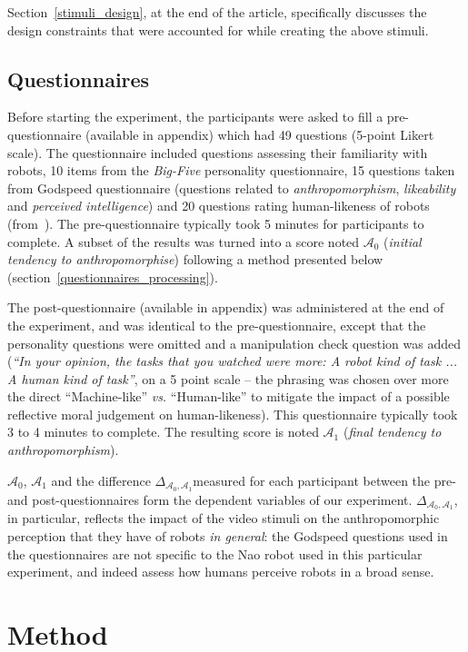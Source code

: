 \documentclass[lettersize, noapacite, twoside, HRI]{apa_HRI}
\newcommand{\vs}{\textit{vs.}\xspace}
\newcommand{\anti}{{$\mathcal{A}_0$\xspace}}
\newcommand{\antf}{{$\mathcal{A}_1$\xspace}}
\newcommand{\deltaant}{{ $\Delta_{\mathcal{A}_0,\mathcal{A}_1}$\xspace}}
\begin{document}
Section~\ref{stimuli_design}, at the end of the article, specifically discusses
the design constraints that were accounted for while creating the above stimuli.

\subsection{Questionnaires}

Before starting the experiment, the participants were asked to fill a
pre-questionnaire (available in appendix) which had 49 questions (5-point Likert scale). The
questionnaire included questions assessing their familiarity with robots, 10
items from the \emph{Big-Five} personality questionnaire, 15 questions taken from
Godspeed questionnaire (questions related to \emph{anthropomorphism},
\emph{likeability} and \emph{perceived intelligence}) and 20 questions rating
human-likeness of robots (from~\cite{ruijten_introducing_2014}). The pre-questionnaire
typically took 5 minutes for participants to complete. A subset of the results was turned into
a score noted \anti{} (\emph{initial tendency to anthropomorphise}) following a
method presented below (section~\ref{questionnaires_processing}).

The post-questionnaire (available in appendix) was administered at the end of the experiment, and was
identical to the pre-questionnaire, except that the personality questions were omitted and a
manipulation check question was added (\emph{``In your opinion, the tasks that
you watched were more: A robot kind of task ... A human kind of task''}, on a 5
point scale -- the phrasing was chosen over more the direct ``Machine-like'' \vs
``Human-like'' to mitigate the impact of a possible reflective moral judgement
on human-likeness).
This questionnaire typically took 3 to 4 minutes to complete. The resulting score is
noted \antf{} (\emph{final tendency to anthropomorphism}).

\anti{}, \antf{} and the difference \deltaant measured for each participant between
the pre- and post-questionnaires form the dependent variables of our experiment.
\deltaant, in particular, reflects the impact of the video stimuli on the
anthropomorphic perception that they have of robots \emph{in general}: the
Godspeed questions used in the questionnaires are not specific to the Nao robot
used in this particular experiment, and indeed assess how humans perceive robots
in a broad sense.

\section{Method}
\end{document}
